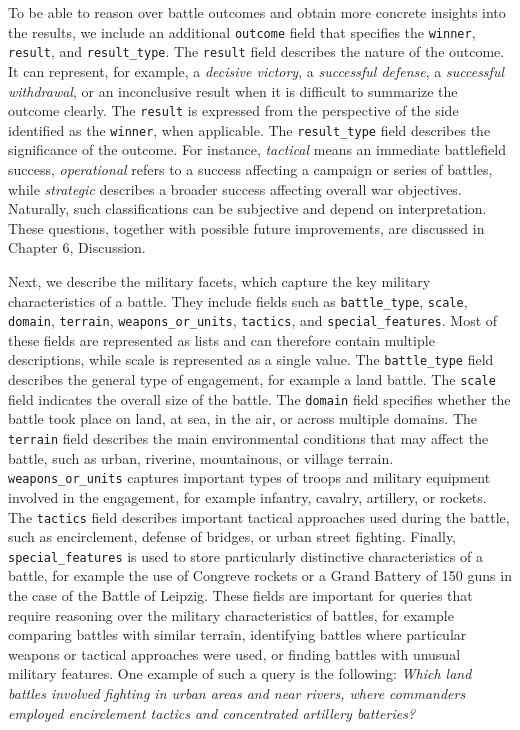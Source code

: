 To be able to reason over battle outcomes and obtain more concrete insights into the results, we include an additional \texttt{outcome} field that specifies the \texttt{winner}, \texttt{result}, and \texttt{result\_type}. The \texttt{result} field describes the nature of the outcome. It can represent, for example, a \textit{decisive victory}, a \textit{successful defense}, a \textit{successful withdrawal}, or an inconclusive result when it is difficult to summarize the outcome clearly. The \texttt{result} is expressed from the perspective of the side identified as the \texttt{winner}, when applicable. The \texttt{result\_type} field describes the significance of the outcome. For instance, \textit{tactical} means an immediate battlefield success, \textit{operational} refers to a success affecting a campaign or series of battles, while \textit{strategic} describes a broader success affecting overall war objectives. Naturally, such classifications can be subjective and depend on interpretation. These questions, together with possible future improvements, are discussed in Chapter 6, Discussion.

Next, we describe the military facets, which capture the key military characteristics of a battle. They include fields such as \texttt{battle\_type}, \texttt{scale}, \texttt{domain}, \texttt{terrain}, \texttt{weapons\_or\_units}, \texttt{tactics}, and \texttt{special\_features}. Most of these fields are represented as lists and can therefore contain multiple descriptions, while scale is represented as a single value. The \texttt{battle\_type} field describes the general type of engagement, for example a land battle. The \texttt{scale} field indicates the overall size of the battle. The \texttt{domain} field specifies whether the battle took place on land, at sea, in the air, or across multiple domains. The \texttt{terrain} field describes the main environmental conditions that may affect the battle, such as urban, riverine, mountainous, or village terrain. \texttt{weapons\_or\_units} captures important types of troops and military equipment involved in the engagement, for example infantry, cavalry, artillery, or rockets. The \texttt{tactics} field describes important tactical approaches used during the battle, such as encirclement, defense of bridges, or urban street fighting. Finally, \texttt{special\_features} is used to store particularly distinctive characteristics of a battle, for example the use of Congreve rockets or a Grand Battery of 150 guns in the case of the Battle of Leipzig. These fields are important for queries that require reasoning over the military characteristics of battles, for example comparing battles with similar terrain, identifying battles where particular weapons or tactical approaches were used, or finding battles with unusual military features. One example of such a query is the following: \textit{Which land battles involved fighting in urban areas and near rivers, where commanders employed encirclement tactics and concentrated artillery batteries?}

